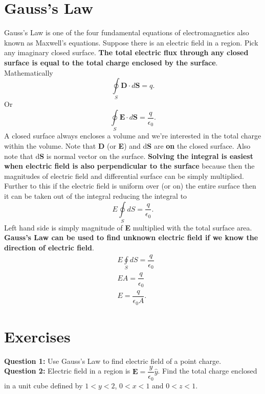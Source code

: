 \documentclass[12pt,a4paper]{article}
\begin{document}
\section{Gauss's Law}
Gauss's Law is one of the four fundamental equations of electromagnetics also known as Maxwell's equations. Suppose there is an electric field in a region. Pick any imaginary closed surface. \textbf{The total electric flux through any closed surface is equal to the total charge enclosed by the surface}. Mathematically
\begin{equation}
\oint\limits_{S}\textbf{D}\cdot d\textbf{S}=q.
\end{equation}
Or
\begin{equation}
\oint\limits_{S}\textbf{E}\cdot d\textbf{S}=\dfrac{q}{\epsilon_0}.
\end{equation}
A closed surface always encloses a volume and we're interested in the total charge within the volume. Note that \textbf{D} (or \textbf{E}) and d\textbf{S} are \textbf{on} the closed surface. Also note that d\textbf{S} is normal vector on the surface. \textbf{Solving the integral is easiest when electric field is also perpendicular to the surface} because then the magnitudes of electric field and differential surface can be simply multiplied. Further to this if the electric field is uniform over (or on) the entire surface then it can be taken out of the integral reducing the integral to
\begin{equation}
E\oint\limits_{S}dS=\dfrac{q}{\epsilon_0}.
\end{equation}
Left hand side is simply magnitude of \textbf{E} multiplied with the total surface area. \textbf{Gauss's Law can be used to find unknown electric field if we know the direction of electric field}.
\begin{equation}
\begin{split}
&E\oint\limits_{S}dS=\dfrac{q}{\epsilon_0}\\
&EA=\dfrac{q}{\epsilon_0}\\
&E=\dfrac{q}{\epsilon_0A}.
\end{split}
\end{equation}
\section{Exercises}
\noindent\textbf{Question 1:} Use Gauss's Law to find electric field of a point charge.\\[0.2cm]
\noindent\textbf{Question 2:} Electric field in a region is $\textbf{E}=\dfrac{y}{\epsilon_0}\hat y$. Find the total charge enclosed in a unit cube defined by $1<y<2$, $0<x<1$ and $0<z<1$.
%
%
\end{document}
